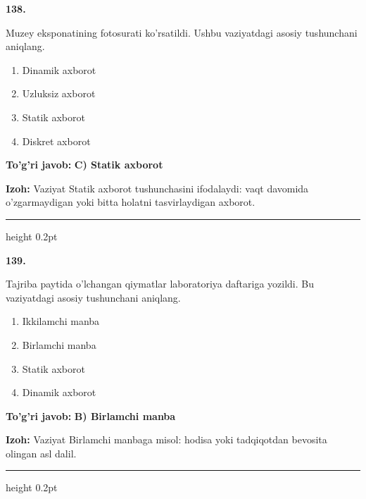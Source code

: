 \documentclass[10pt,a4paper,oneside]{article}
\begin{document}
\noindent\textbf{\color{ink}138.}
\par
Muzey eksponatining fotosurati ko'rsatildi. Ushbu vaziyatdagi asosiy tushunchani aniqlang.
\begin{enumerate}[label=\Alph*),leftmargin=9mm]
\item Dinamik axborot
\item Uzluksiz axborot
\item Statik axborot
\item Diskret axborot
\end{enumerate}
\begin{tcolorbox}[enhanced,breakable,colback=teal!4,colframe=teal!50!black,boxrule=0.5pt,arc=1.1mm,left=3mm,right=3mm,top=1.7mm,bottom=1.7mm,before skip=2mm,after skip=2mm]
\textbf{\color{teal}To'g'ri javob:} \textbf{C) Statik axborot}
\par\smallskip
\textbf{Izoh:} Vaziyat Statik axborot tushunchasini ifodalaydi: vaqt davomida o'zgarmaydigan yoki bitta holatni tasvirlaydigan axborot.
\end{tcolorbox}
\vspace{2mm}\hrule height 0.2pt \vspace{3mm}

\noindent\textbf{\color{ink}139.}
\par
Tajriba paytida o'lchangan qiymatlar laboratoriya daftariga yozildi. Bu vaziyatdagi asosiy tushunchani aniqlang.
\begin{enumerate}[label=\Alph*),leftmargin=9mm]
\item Ikkilamchi manba
\item Birlamchi manba
\item Statik axborot
\item Dinamik axborot
\end{enumerate}
\begin{tcolorbox}[enhanced,breakable,colback=teal!4,colframe=teal!50!black,boxrule=0.5pt,arc=1.1mm,left=3mm,right=3mm,top=1.7mm,bottom=1.7mm,before skip=2mm,after skip=2mm]
\textbf{\color{teal}To'g'ri javob:} \textbf{B) Birlamchi manba}
\par\smallskip
\textbf{Izoh:} Vaziyat Birlamchi manbaga misol: hodisa yoki tadqiqotdan bevosita olingan asl dalil.
\end{tcolorbox}
\vspace{2mm}\hrule height 0.2pt \vspace{3mm}
\end{document}
